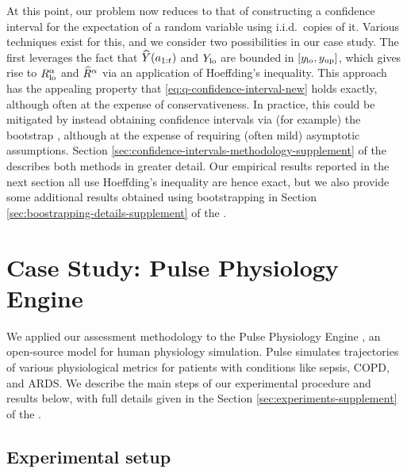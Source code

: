 At this point, our problem now reduces to that of constructing a confidence interval for the expectation of a random variable using i.i.d.\ copies of it.
Various techniques exist for this, and we consider two possibilities in our case study.
The first leverages the fact that $\widehat{Y}(a_{1:t})$ and $Y_{\mathrm{lo}}$ are bounded in $[y_{\mathrm{lo}}, y_{\mathrm{up}}]$, which gives rise to $R_{\mathrm{lo}}^{\alpha}$ and $\widehat{R}^{\alpha}$ via an application of Hoeffding's inequality.
This approach has the appealing property that \eqref{eq:q-confidence-interval-new} holds exactly, although often at the expense of conservativeness.
In practice, this could be mitigated by instead obtaining confidence intervals via (for example) the bootstrap \cite{efron1979bootstrap}, although at the expense of requiring (often mild) asymptotic assumptions.
%
Section \ref{sec:confidence-intervals-methodology-supplement} of the \AppendixName describes both methods in greater detail.
Our empirical results reported in the next section all use Hoeffding's inequality are hence exact, but we also provide some additional results obtained using bootstrapping in Section \ref{sec:boostrapping-details-supplement} of the \AppendixName.

%
%
%
%

%

%

%
%
%
%
%

%

%
%
%
%
%
%


%

%

%
%
%
%
%
%
%
%
%
%
%
%
%
%
%
%
%
%
%
%
%
%
%
%
%

%

%

%
%
%
%
%
%
%

\section{Case Study: Pulse Physiology Engine} \label{sec:case-study}

We applied our assessment methodology to the Pulse Physiology Engine \cite{pulse}, an open-source model for human physiology simulation.
Pulse simulates trajectories of various physiological metrics for patients with conditions like sepsis, COPD, and ARDS.
%
%
We describe the main steps of our experimental procedure and results below, with full details given in the Section \ref{sec:experiments-supplement} of the \AppendixName. 
%

\subsection{Experimental setup} \label{sec:experimental-setup}

